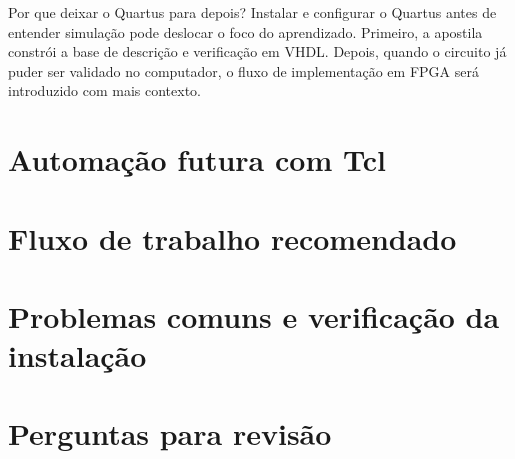 \begin{observacao}{Por que deixar o Quartus para depois?}
Instalar e configurar o Quartus antes de entender simulação pode deslocar o foco do aprendizado. Primeiro, a apostila constrói a base de descrição e verificação em VHDL. Depois, quando o circuito já puder ser validado no computador, o fluxo de implementação em FPGA será introduzido com mais contexto.
\end{observacao}

\section{Automação futura com Tcl}

\section{Fluxo de trabalho recomendado}

\section{Problemas comuns e verificação da instalação}

\section{Perguntas para revisão}
